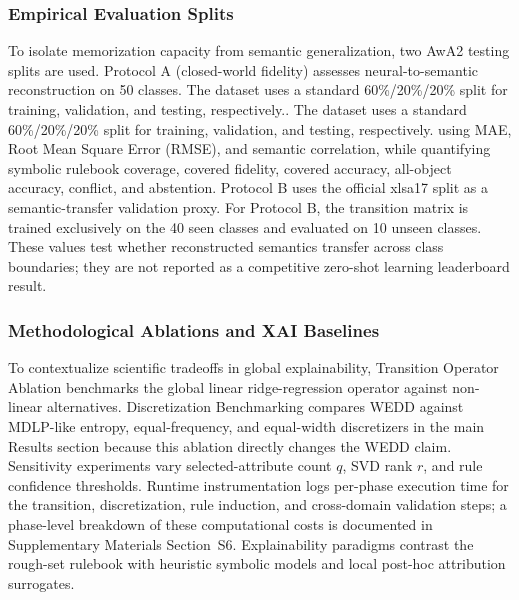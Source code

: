 \documentclass[make,article,submit,pdftex,moreauthors]{Definitions/mdpi}
\begin{document}
\subsubsection{Empirical Evaluation Splits}
\label{subsubsec:evaluation_splits}

To isolate memorization capacity from semantic generalization, two AwA2 testing splits are used. Protocol A (closed-world fidelity) assesses neural-to-semantic reconstruction on 50 classes. The dataset uses a standard 60\%/20\%/20\% split for training, validation, and testing, respectively.. The dataset uses a standard 60\%/20\%/20\% split for training, validation, and testing, respectively. using MAE, Root Mean Square Error (RMSE), and semantic correlation, while quantifying symbolic rulebook coverage, covered fidelity, covered accuracy, all-object accuracy, conflict, and abstention. Protocol B uses the official xlsa17 split as a semantic-transfer validation proxy. For Protocol B, the transition matrix is trained exclusively on the 40 seen classes and evaluated on 10 unseen classes. These values test whether reconstructed semantics transfer across class boundaries; they are not reported as a competitive zero-shot learning leaderboard result.

\subsubsection{Methodological Ablations and XAI Baselines}
\label{subsubsec:methodological_ablations}

To contextualize scientific tradeoffs in global explainability, Transition Operator Ablation benchmarks the global linear ridge-regression operator against non-linear alternatives. Discretization Benchmarking compares WEDD against MDLP-like entropy, equal-frequency, and equal-width discretizers in the main Results section because this ablation directly changes the WEDD claim. Sensitivity experiments vary selected-attribute count $q$, SVD rank $r$, and rule confidence thresholds. Runtime instrumentation logs per-phase execution time for the transition, discretization, rule induction, and cross-domain validation steps; a phase-level breakdown of these computational costs is documented in Supplementary Materials Section~S6. Explainability paradigms contrast the rough-set rulebook with heuristic symbolic models and local post-hoc attribution surrogates.
\end{document}

